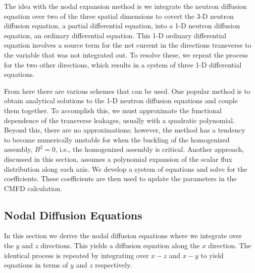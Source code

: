 The idea with the nodal expansion method is we integrate the neutron diffusion equation over two of the three spatial dimensions to covert the 3-D neutron diffusion equation, a partial differential equation, into a 1-D neutron diffusion equation, an ordinary differential equation. This 1-D ordinary differential equation involves a source term for the net current in the directions transverse to the variable that was not integrated out. To resolve these, we repeat the process for the two other directions, which results in a system of three 1-D differential equations.

From here there are various schemes that can be used. One popular method is to obtain analytical solutions to the 1-D neutron diffusion equations and couple them together. To accomplish this, we must approximate the functional dependence of the transverse leakages, usually with a quadratic polynomial. Beyond this, there are no approximations; however, the method has a tendency to become numerically unstable for when the buckling of the homogenized assembly, $B^2 = 0$, i.e., the homogenized assembly is critical. Another approach, discussed in this section, assumes a polynomial expansion of the scalar flux distribution along each axis. We develop a system of equations and solve for the coefficients. These coefficients are then used to update the parameters in the CMFD calculation.




\subsection{Nodal Diffusion Equations}

In this section we derive the nodal diffusion equations where we integrate over the $y$ and $z$ directions. This yields a diffusion equation along the $x$ direction. The identical process is repeated by integrating over $x-z$ and $x-y$ to yield equations in terms of $y$ and $z$ respectively.

